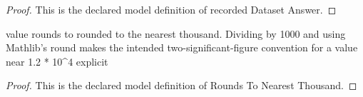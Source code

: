 \begin{proof}
  This is the declared model definition of recorded Dataset Answer.
\end{proof}
\begin{definition}
  \label{def:physics:phyx-mini-0914:phyxminiproblems-problemphyxmini0914-roundstonearestthousand}
  value rounds to rounded to the nearest thousand. Dividing by 1000 and using Mathlib's round makes the intended two-significant-figure convention for a value near 1.2 * 10\textasciicircum{}4 explicit
\end{definition}
\begin{proof}
  This is the declared model definition of Rounds To Nearest Thousand.
\end{proof}
